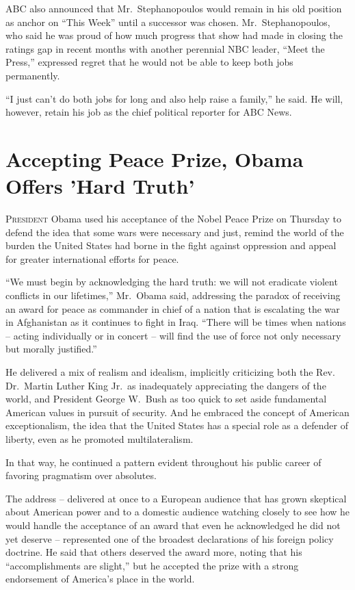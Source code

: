 ﻿\documentclass[12pt]{article}
\begin{document}
ABC also announced that Mr.~Stephanopoulos would remain in his old position as anchor on ``This
Week'' until a successor was chosen. Mr.~Stephanopoulos, who said he was proud of how much progress
that show had made in closing the ratings gap in recent months with another perennial NBC leader,
``Meet the Press,'' expressed regret that he would not be able to keep both jobs permanently.

``I just can't do both jobs for long and also help raise a family,'' he said. He will, however,
retain his job as the chief political reporter for ABC News.

\section{Accepting Peace Prize, Obama Offers 'Hard Truth'}

\lettrine{P}{resident} Obama used his acceptance of the Nobel Peace Prize on
Thursday to defend the idea that some wars were necessary and just, remind the world of the burden
the United States had borne in the fight against oppression and appeal for greater international
efforts for peace.

``We must begin by acknowledging the hard truth: we will not eradicate violent conflicts in our
lifetimes,'' Mr.~Obama said, addressing the paradox of receiving an award for peace as commander in
chief of a nation that is escalating the war in Afghanistan as it continues to fight in Iraq.
``There will be times when nations -- acting individually or in concert -- will find the use of
force not only necessary but morally justified.''

He delivered a mix of realism and idealism, implicitly criticizing both the Rev. Dr.~Martin Luther
King Jr.~as inadequately appreciating the dangers of the world, and President George W.~Bush as too
quick to set aside fundamental American values in pursuit of security. And he embraced the concept
of American exceptionalism, the idea that the United States has a special role as a defender of
liberty, even as he promoted multilateralism.

In that way, he continued a pattern evident throughout his public career of favoring pragmatism over
absolutes.

The address -- delivered at once to a European audience that has grown skeptical about American
power and to a domestic audience watching closely to see how he would handle the acceptance of an
award that even he acknowledged he did not yet deserve -- represented one of the broadest
declarations of his foreign policy doctrine. He said that others deserved the award more, noting
that his ``accomplishments are slight,'' but he accepted the prize with a strong endorsement of
America's place in the world.
\end{document}
